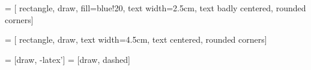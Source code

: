 \usepackage{tikz}
\usetikzlibrary{
	shapes,
    arrows,
    shapes.geometric,
    positioning,
}

 = [
	rectangle,
    draw,
    fill=blue!20,
    text width=2.5cm,
    text badly centered,
    rounded corners]

 = [
	rectangle,
	draw,
    text width=4.5cm,
    text centered,
    rounded corners]

 = [draw, -latex']
 = [draw, dashed]

